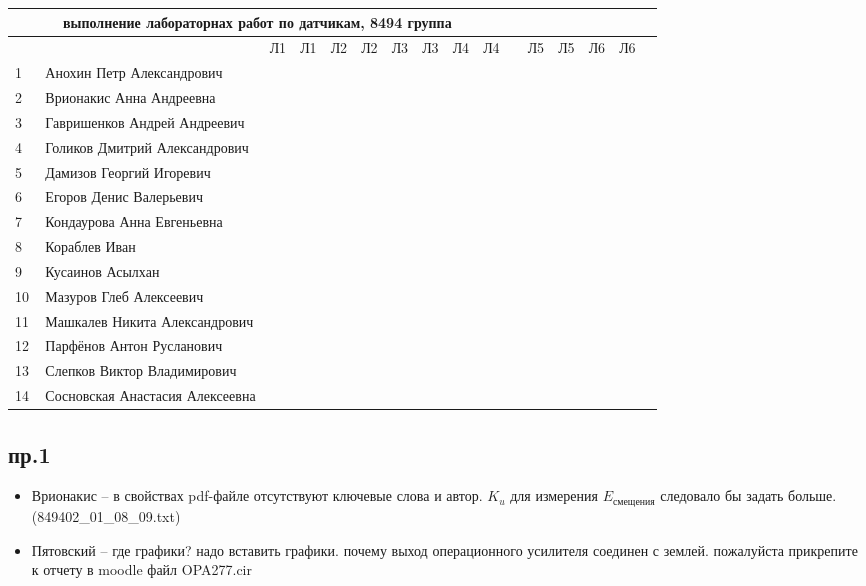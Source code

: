 \documentclass[a4paper,landscape,11pt]{article}
\begin{document}
\newpage
%
\begin{tabular}{l|llccccccccccccc}
\multicolumn{10}{c}{выполнение лабораторнах работ по датчикам, 8494 группа} \\
\toprule
&&Л1&Л1& Л2&Л2& Л3&Л3& Л4&Л4& &Л5&Л5& Л6&Л6\\
\midrule
1\,&   Анохин Петр Александрович       &&&&&&&&\\
2\,&   Врионакис Анна Андреевна        &&&&&&&&\\
3\,&   Гавришенков Андрей Андреевич    &&&&&&&&\\
4\,&   Голиков Дмитрий Александрович   &&&&&&&&\\
5\,&   Дамизов Георгий Игоревич        &&&&&&&&\\
\midrule
6\,&   Егоров Денис Валерьевич         &&&&&&&&\\
7\,&   Кондаурова Анна Евгеньевна      &&&&&&&&\\
8\,&   Кораблев Иван                   &&&&&&&&\\
9\,&   Кусаинов Асылхан                &&&&&&&&\\
10\,&  Мазуров Глеб Алексеевич         &&&&&&&&\\
\midrule
11\,&  Машкалев Никита Александрович   &&&&&&&&\\
12\,&  Парфёнов Антон Русланович       &&&&&&&&\\
13\,&  Слепков Виктор Владимирович     &&&&&&&&\\
14\,&  Сосновская Анастасия Алексеевна &&&&&&&&\\
\bottomrule
\end{tabular}

\subsection*{пр.1}
\begin{itemize}
	\item Врионакис -- в свойствах pdf-файле отсутствуют ключевые слова и автор. $K_u$ для измерения $E_\text{смещения}$ следовало бы задать больше. (849402\_01\_08\_09.txt)
	\item Пятовский --
		где графики? надо вставить графики.
почему выход операционного усилителя соединен с землей.
пожалуйста прикрепите к отчету в moodle файл   OPA277.cir
\end{itemize}
\end{document}
